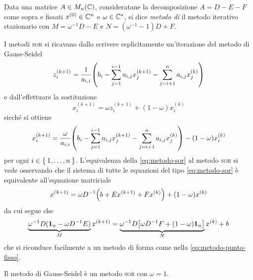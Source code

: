 	\begin{definizione}\label{def:metodo-sor}
		Data una matrice \(A \in M_n (\mathbb{C})\), consideratane la decomposizione \(A = D - E - F\) come sopra e fissati \(x^{(0)} \in \mathbb{C}^n\) e \(\omega \in \mathbb{C}^*\), si dice \emph{metodo di } il metodo iterativo stazionario con \(M = \omega^{-1} D - E\) e \(N = (\omega^{-1} - 1) D + F\).
	\end{definizione}

	\begin{osservazione}
		I metodi \textsc{sor} si ricavano dallo scrivere esplicitamente un'iterazione del metodo di Gauss-Seidel
		\begin{equation*}
			z_i^{(k + 1)} = \frac{1}{a_{i, i}} \qty(b_i - \sum_{j = 1}^{i - 1} a_{i, j} x_j^{(k + 1)} - \sum_{j = i + 1}^n a_{i, j} x_j^{(k)})
		\end{equation*}
		e dall'effettuare la sostituzione
		\begin{equation*}
			x_i^{(k + 1)} = \omega z_i^{(k + 1)} + (1 - \omega) x_i^{(k)}
		\end{equation*}
		sicché si ottiene
		\begin{equation}\label{eq:metodo-sor}
			x_i^{(k + 1)} = \frac{\omega}{a_{i, i}} \qty(b_i - \sum_{j = 1}^{i - 1} a_{i, j} x_j^{(k + 1)} - \sum_{j = i + 1}^n a_{i, j} x_j^{(k)}) - (1 - \omega) x_i^{(k)}
		\end{equation}
		per ogni \(i \in \Set{1, \dots, n}\). L'equivalenza della \eqref{eq:metodo-sor} al metodo \textsc{sor} si vede osservando che il sistema di tutte le equazioni del tipo \eqref{eq:metodo-sor} è equivalente all'equazione matriciale
		\begin{equation*}
			x^{(k + 1)} = \omega D^{-1} \qty(b + E x^{(k + 1)} + F x^{(k)}) + (1 - \omega) x^{(k)}
		\end{equation*}
		da cui segue che
		\begin{equation*}
			\underbrace{\omega^{-1} D (\mathbf{1}_n - \omega D^{-1} E)}_{M} x^{(k + 1)} = \underbrace{\omega^{-1} D \qty[\omega D^{-1} F + (1 - \omega) \mathbf{1}_n]}_{N} x^{(k)} + b
		\end{equation*}
		che si riconduce facilmente a un metodo di forma come nella \eqref{eq:metodo-punto-fisso}.
	\end{osservazione}

	\begin{nota}
		Il metodo di Gauss-Seidel è un metodo \textsc{sor} con \(\omega = 1\).
	\end{nota}

